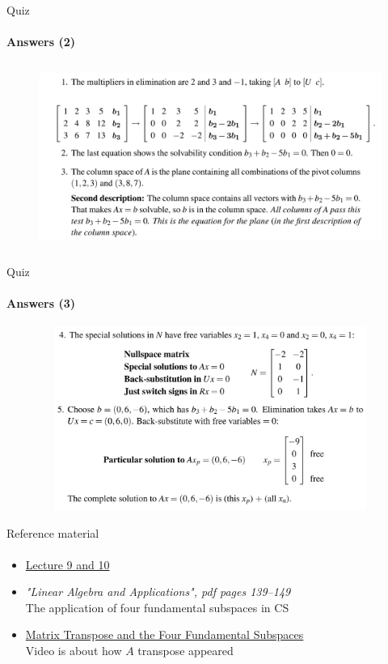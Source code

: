 \documentclass[aspectratio=169]{beamer}
\begin{document}
\begin{frame}[t]{Quiz}
    \vspace{-0.35cm}
    \framesubtitle{Answers (2)}
    \begin{figure}[H]
        \centering\includegraphics[height=6cm,width=1\textwidth,keepaspectratio]{quiz21.png}
        \label{fig:quiz21.png}
    \end{figure}
\end{frame}

\begin{frame}[t]{Quiz}
    \framesubtitle{Answers (3)}
    \vspace{-0.35cm}
    \begin{figure}[H]
        \centering\includegraphics[height=6cm,width=1\textwidth,keepaspectratio]{quiz22.png}
        \label{fig:quiz22.png}
    \end{figure}
\end{frame}

\begin{frame}[t]{Reference material}
    \framesubtitle{}
    \Large
    \begin{itemize}
        \item \href{https://www.youtube.com/watch?v=yjBerM5jWsc&list=PL49CF3715CB9EF31D&index=9}{Lecture 9 and 10}
        \item \textit{"Linear Algebra and Applications", pdf pages 139--149 }\\ The application of four fundamental subspaces in CS
        \item \href{https://youtu.be/yfj8uMwAgrI}{Matrix Transpose and the Four Fundamental Subspaces}\\ Video is about how $A$ transpose appeared
    \end{itemize}
\end{frame}
\end{document}
